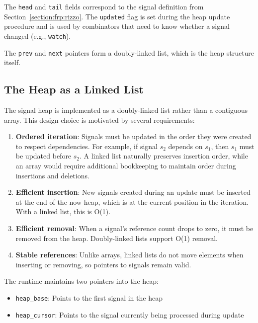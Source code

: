 The \texttt{head} and \texttt{tail} fields correspond to the signal definition from Section~\ref{section:frp:rizzo}. The \texttt{updated} flag is set during the heap update procedure and is used by combinators that need to know whether a signal changed (e.g., \texttt{watch}).

The \texttt{prev} and \texttt{next} pointers form a doubly-linked list, which is the heap structure itself.

\subsection{The Heap as a Linked List}

The signal heap is implemented as a doubly-linked list rather than a contiguous array. This design choice is motivated by several requirements:

\begin{enumerate}
    \item \textbf{Ordered iteration}: Signals must be updated in the order they were created to respect dependencies. For example, if signal $s_2$ depends on $s_1$, then $s_1$ must be updated before $s_2$. A linked list naturally preserves insertion order, while an array would require additional bookkeeping to maintain order during insertions and deletions.

    \item \textbf{Efficient insertion}: New signals created during an update must be inserted at the end of the now heap, which is at the current position in the iteration. With a linked list, this is O(1).

    \item \textbf{Efficient removal}: When a signal's reference count drops to zero, it must be removed from the heap. Doubly-linked lists support O(1) removal.

    \item \textbf{Stable references}: Unlike arrays, linked lists do not move elements when inserting or removing, so pointers to signals remain valid.
\end{enumerate}

The runtime maintains two pointers into the heap:
\begin{itemize}
    \item \texttt{heap\_base}: Points to the first signal in the heap
    \item \texttt{heap\_cursor}: Points to the signal currently being processed during update
\end{itemize}

